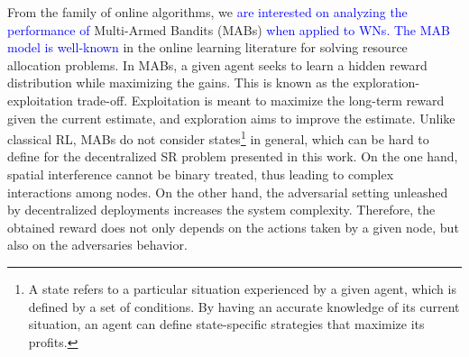 \documentclass[preprint,12pt]{elsarticle}
\begin{document}
	From the family of online algorithms, we \textcolor{blue}{are interested on analyzing the performance of} Multi-Armed Bandits (MABs) \cite{BCB12} \textcolor{blue}{when applied to WNs. The MAB model is well-known} in the online learning literature for solving resource allocation problems. In MABs, a given agent seeks to learn a hidden reward distribution while maximizing the gains. This is known as the exploration-exploitation trade-off. Exploitation is meant to maximize the long-term reward given the current estimate, and exploration aims to improve the estimate. Unlike classical RL, MABs do not consider states\footnote{A state refers to a particular situation experienced by a given agent, which is defined by a set of conditions. By having an accurate knowledge of its current situation, an agent can define state-specific strategies that maximize its profits.} in general, which can be hard to define for the decentralized SR problem presented in this work. On the one hand, spatial interference cannot be binary treated, thus leading to complex interactions among nodes. On the other hand, the adversarial setting unleashed by decentralized deployments increases the system complexity. Therefore, the obtained reward does not only depends on the actions taken by a given node, but also on the adversaries behavior.
	
\end{document}
